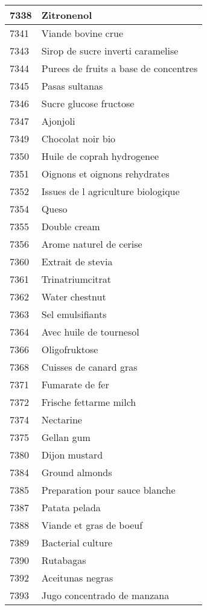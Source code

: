 \begin{longtable}{|l|l|}
7338 & Zitronenol \\ \hline 
7341 & Viande bovine crue \\ \hline 
7343 & Sirop de sucre inverti caramelise \\ \hline 
7344 & Purees de fruits a base de concentres \\ \hline 
7345 & Pasas sultanas \\ \hline 
7346 & Sucre glucose fructose \\ \hline 
7347 & Ajonjoli \\ \hline 
7349 & Chocolat noir bio \\ \hline 
7350 & Huile de coprah hydrogenee \\ \hline 
7351 & Oignons et oignons rehydrates \\ \hline 
7352 & Issues de l agriculture biologique \\ \hline 
7354 & Queso \\ \hline 
7355 & Double cream \\ \hline 
7356 & Arome naturel de cerise \\ \hline 
7360 & Extrait de stevia \\ \hline 
7361 & Trinatriumcitrat \\ \hline 
7362 & Water chestnut \\ \hline 
7363 & Sel emulsifiants \\ \hline 
7364 & Avec huile de tournesol \\ \hline 
7366 & Oligofruktose \\ \hline 
7368 & Cuisses de canard gras \\ \hline 
7371 & Fumarate de fer \\ \hline 
7372 & Frische fettarme milch \\ \hline 
7374 & Nectarine \\ \hline 
7375 & Gellan gum \\ \hline 
7380 & Dijon mustard \\ \hline 
7384 & Ground almonds \\ \hline 
7385 & Preparation pour sauce blanche \\ \hline 
7387 & Patata pelada \\ \hline 
7388 & Viande et gras de boeuf \\ \hline 
7389 & Bacterial culture \\ \hline 
7390 & Rutabagas \\ \hline 
7392 & Aceitunas negras \\ \hline 
7393 & Jugo concentrado de manzana \\ \hline 

\end{longtable}
